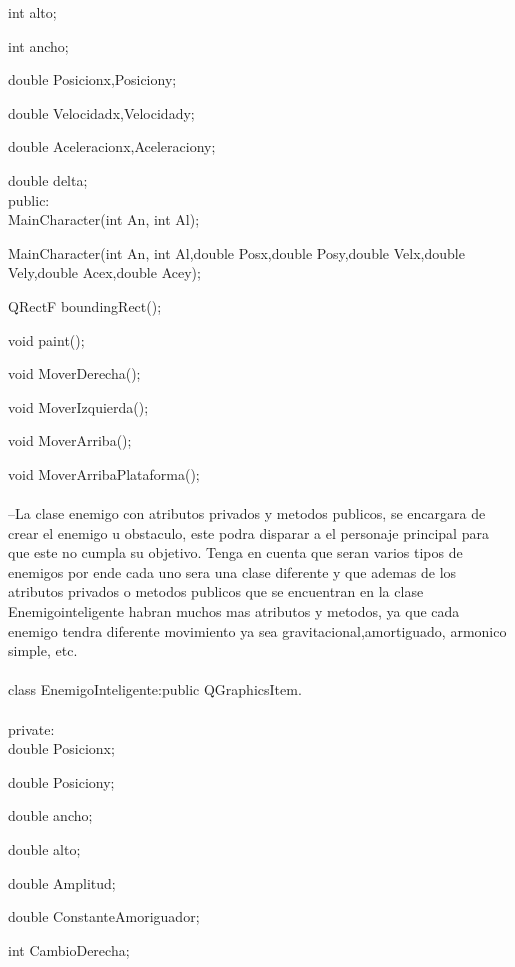 \documentclass{article}
\begin{document}
    int alto;
    
    int ancho;
    
    double Posicionx,Posiciony;
    
    double Velocidadx,Velocidady;
    
    double Aceleracionx,Aceleraciony;
    
    double delta;\\
public:\\

    MainCharacter(int An, int Al);
    
    MainCharacter(int An, int Al,double Posx,double Posy,double Velx,double Vely,double Acex,double Acey);
    
    QRectF boundingRect();
    
    void paint();
    
    void MoverDerecha();
    
    void MoverIzquierda();
    
    void MoverArriba();
    
    void MoverArribaPlataforma();\\
    
\rbrace\\

--La clase enemigo con atributos privados y metodos publicos, se encargara de crear el enemigo u obstaculo, este podra disparar a el personaje principal para que este no cumpla su objetivo. Tenga en cuenta que seran varios tipos de enemigos por ende cada uno sera una clase diferente y que ademas de los atributos privados o metodos publicos que se encuentran en la clase Enemigointeligente habran muchos mas atributos y metodos, ya que cada enemigo tendra diferente movimiento ya sea gravitacional,amortiguado, armonico simple, etc.\\
\\
class EnemigoInteligente:public QGraphicsItem.\\
\lbrace\\
private:\\

    double Posicionx;
    
    double Posiciony;
    
    double ancho;
    
    double alto;
    
    double Amplitud;
    
    double ConstanteAmoriguador;

    int CambioDerecha;
    
\end{document}
